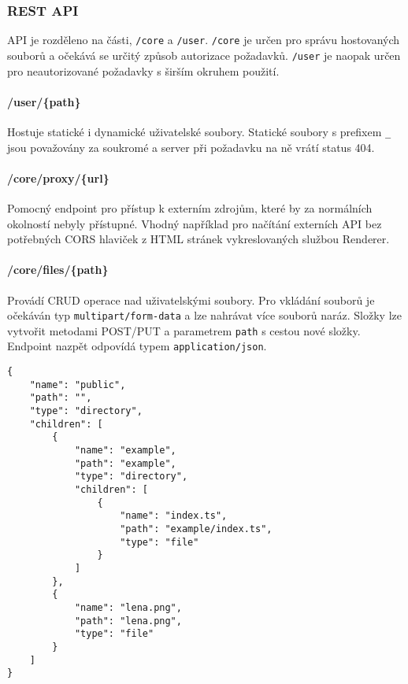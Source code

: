 \subsubsection{REST API}
API je rozděleno na části, \lstinline|/core| a \lstinline|/user|. \lstinline|/core| je určen pro správu hostovaných souborů a očekává se určitý způsob autorizace požadavků. \lstinline|/user| je naopak určen pro neautorizované požadavky s širším okruhem použití.

\paragraph*{/user/\{path\}} Hostuje statické i dynamické uživatelské soubory. Statické soubory s prefixem \lstinline{_} jsou považovány za soukromé a server při požadavku na ně vrátí status 404.

\paragraph*{/core/proxy/\{url\}}
Pomocný endpoint pro přístup k externím zdrojům, které by za normálních okolností nebyly přístupné. Vhodný například pro načítání externích API bez potřebných CORS hlaviček z HTML stránek vykreslovaných službou Renderer.

\paragraph*{/core/files/\{path\}}
Provádí CRUD operace nad uživatelskými soubory. Pro vkládání souborů je očekáván typ \lstinline|multipart/form-data| a lze nahrávat více souborů naráz. Složky lze vytvořit metodami POST/PUT a parametrem \lstinline|path| s cestou nové složky. Endpoint nazpět odpovídá typem \lstinline|application/json|.

\begin{lstlisting}[label=src:get-files-response,caption={Odpověď na dotaz GET /core/files/}]
{
    "name": "public",
    "path": "",
    "type": "directory",
    "children": [
        {
            "name": "example",
            "path": "example",
            "type": "directory",
            "children": [
                {
                    "name": "index.ts",
                    "path": "example/index.ts",
                    "type": "file"
                }
            ]
        },
        {
            "name": "lena.png",
            "path": "lena.png",
            "type": "file"
        }
    ]
}
\end{lstlisting}

